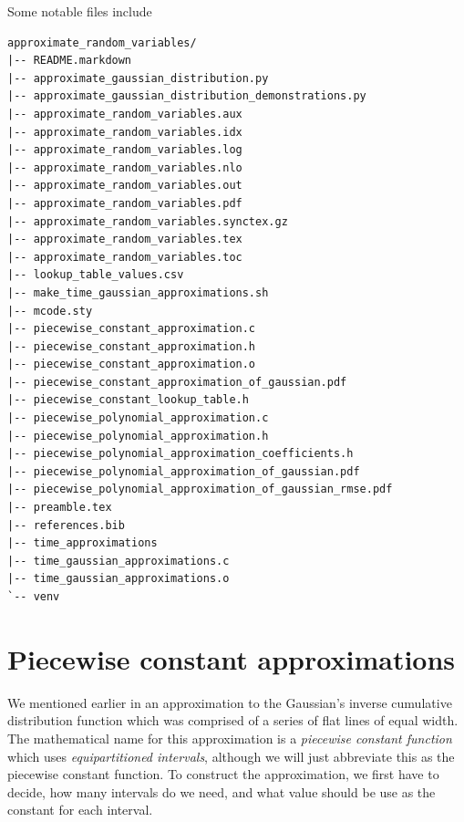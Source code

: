 \documentclass[11pt,a4paper,oneside,english]{extarticle}
\begin{document}
Some notable files include
\begin{lstfloat}[htb]
\begin{verbatim}
approximate_random_variables/
|-- README.markdown
|-- approximate_gaussian_distribution.py
|-- approximate_gaussian_distribution_demonstrations.py
|-- approximate_random_variables.aux
|-- approximate_random_variables.idx
|-- approximate_random_variables.log
|-- approximate_random_variables.nlo
|-- approximate_random_variables.out
|-- approximate_random_variables.pdf
|-- approximate_random_variables.synctex.gz
|-- approximate_random_variables.tex
|-- approximate_random_variables.toc
|-- lookup_table_values.csv
|-- make_time_gaussian_approximations.sh
|-- mcode.sty
|-- piecewise_constant_approximation.c
|-- piecewise_constant_approximation.h
|-- piecewise_constant_approximation.o
|-- piecewise_constant_approximation_of_gaussian.pdf
|-- piecewise_constant_lookup_table.h
|-- piecewise_polynomial_approximation.c
|-- piecewise_polynomial_approximation.h
|-- piecewise_polynomial_approximation_coefficients.h
|-- piecewise_polynomial_approximation_of_gaussian.pdf
|-- piecewise_polynomial_approximation_of_gaussian_rmse.pdf
|-- preamble.tex
|-- references.bib
|-- time_approximations
|-- time_gaussian_approximations.c
|-- time_gaussian_approximations.o
`-- venv
\end{verbatim}
\end{lstfloat}


\section{Piecewise constant approximations}

We mentioned earlier in  an approximation to the Gaussian's inverse cumulative distribution function which was comprised of a series of flat lines of equal width. The mathematical name for this approximation is a \emph{piecewise constant function} which uses \emph{equipartitioned intervals}, although we will just abbreviate this as the piecewise constant function. To construct the approximation, we first have to decide, how many intervals do we need, and what value should be use as the constant for each interval. 
\end{document}
